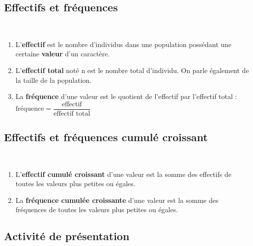 \documentclass[paper=a4, fontsize=9pt]{scrartcl} %
\begin{document}
\begin{multicols}{2}

  \subsection{Effectifs et fréquences}

  \begin{Definition}~~\\
    \begin{enumerate}
    \item L'\textbf{effectif} est le nombre d'individus dans une population possédant une certaine \textbf{valeur} d'un caractère.
    \item L'\textbf{effectif total} noté n est le nombre total d'individu. On parle également de la taille de la population.
    \item La \textbf{fréquence} d'une valeur est le quotient de l'effectif par l'effectif total : $\text{fréquence} = \dfrac{\text{effectif}}{\text{effectif total}}$
    \end{enumerate}
  \end{Definition}

  \subsection{Effectifs et fréquences cumulé croissant}

  \begin{Definition}~~\\
    \begin{enumerate}
    \item L'\textbf{effectif cumulé croissant} d'une valeur est la somme des effectifs de toutes les valeurs plus petites ou égales.
    \item La \textbf{fréquence cumulée croissante} d'une valeur est la somme des fréquences de toutes les valeurs plus petites ou égales.
    \end{enumerate}
  \end{Definition}

\end{multicols}

\subsection{Activité de présentation}
\end{document}
